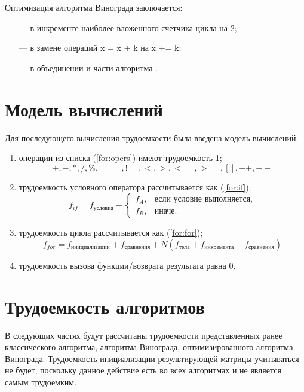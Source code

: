 \clearpage

Оптимизация алгоритма Винограда заключается:
\begin{itemize}
	\item[---] в инкременте наиболее вложенного счетчика цикла на 2;
	\item[---] в замене операций x = x + k на x += k;
	\item[---] в объединении  и  части алгоритма .
\end{itemize}

\section{Модель вычислений}
Для последующего вычисления трудоемкости была введена модель вычислений:
\begin{enumerate}
	\item операции из списка (\ref{for:opers}) имеют трудоемкость 1;
	\begin{equation}
		\label{for:opers}
		+, -, *, /, \%, ==, !=, <, >, <=, >=, [], ++, {-}-
	\end{equation}
	\item трудоемкость условного оператора  рассчитывается как (\ref{for:if});
	\begin{equation}
		\label{for:if}
		f_{if} = f_{\text{условия}} +
		\begin{cases}
			f_A, & \text{если условие выполняется,}\\
			f_B, & \text{иначе.}
		\end{cases}
	\end{equation}
	\item трудоемкость цикла рассчитывается как (\ref{for:for});
	\begin{equation}
		\label{for:for}
		f_{for} = f_{\text{инициализации}} + f_{\text{сравнения}} + N(f_{\text{тела}} + f_{\text{инкремента}} + f_{\text{сравнения}})
	\end{equation}
	\item трудоемкость вызова функции/возврата результата равна 0.
\end{enumerate}


\section{Трудоемкость алгоритмов}
В следующих частях будут рассчитаны трудоемкости представленных ранее классического алгоритма, алгоритма Винограда, оптимизированного алгоритма Винограда.
Трудоемкость инициализации результирующей матрицы учитываться не будет, поскольку данное действие есть во всех алгоритмах и не является самым трудоемким.

